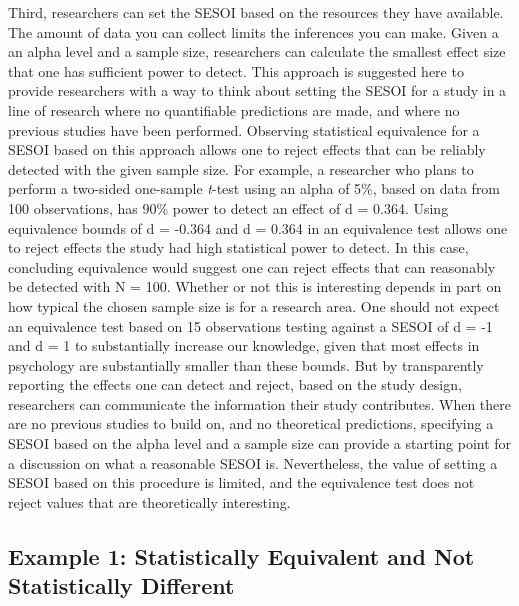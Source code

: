 \documentclass[english,man]{apa6}
\theoremstyle{definition}
\theoremstyle{definition}
\theoremstyle{definition}
\theoremstyle{remark}
\begin{document}
Third, researchers can set the SESOI based on the resources they have
available. The amount of data you can collect limits the inferences you
can make. Given a an alpha level and a sample size, researchers can
calculate the smallest effect size that one has sufficient power to
detect. This approach is suggested here to provide researchers with a
way to think about setting the SESOI for a study in a line of research
where no quantifiable predictions are made, and where no previous
studies have been performed. Observing statistical equivalence for a
SESOI based on this approach allows one to reject effects that can be
reliably detected with the given sample size. For example, a researcher
who plans to perform a two-sided one-sample \emph{t}-test using an alpha
of 5\%, based on data from 100 observations, has 90\% power to detect an
effect of d = 0.364. Using equivalence bounds of d = -0.364 and d =
0.364 in an equivalence test allows one to reject effects the study had
high statistical power to detect. In this case, concluding equivalence
would suggest one can reject effects that can reasonably be detected
with N = 100. Whether or not this is interesting depends in part on how
typical the chosen sample size is for a research area. One should not
expect an equivalence test based on 15 observations testing against a
SESOI of d = -1 and d = 1 to substantially increase our knowledge, given
that most effects in psychology are substantially smaller than these
bounds. But by transparently reporting the effects one can detect and
reject, based on the study design, researchers can communicate the
information their study contributes. When there are no previous studies
to build on, and no theoretical predictions, specifying a SESOI based on
the alpha level and a sample size can provide a starting point for a
discussion on what a reasonable SESOI is. Nevertheless, the value of
setting a SESOI based on this procedure is limited, and the equivalence
test does not reject values that are theoretically interesting.

\subsection{Example 1: Statistically Equivalent and Not Statistically
Different}\label{example-1-statistically-equivalent-and-not-statistically-different}
\end{document}
